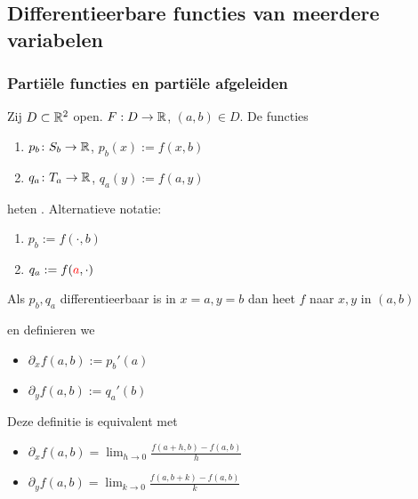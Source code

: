 \documentclass{2wa40summary}
\begin{document}
	\subsection{Differentieerbare functies van meerdere variabelen}
	\subsubsection{Parti\"ele functies en parti\"ele afgeleiden}
	
	\begin{define}
		Zij $D \subset \mathbb{R}^2$ open. $F:D \rightarrow \mathbb{R}$, $(a,b) \in D$.
		De functies
		\begin{enumerate}
			\item $p_b\colon S_b \rightarrow \mathbb{R}$, $p_b(x):=f(x,b)$
			\item $q_a\colon T_a \rightarrow \mathbb{R}$, $q_a(y):=f(a,y)$
		\end{enumerate}
		heten .
		Alternatieve notatie:
		\begin{enumerate}
			\item $p_b:=f(\cdot, b)$
			\item $q_a:=f({\color{red}a},\cdot)$
		\end{enumerate}
		
	\end{define}
	
	\begin{define}
		Als $p_b, q_a$ differentieerbaar is in $x=a,y=b$ dan heet $f$  naar $x,y$ in $(a,b)$
		
		en definieren we
		\begin{itemize}
			\item $\partial_x f(a,b) := p_b'(a)$
			\item $\partial_y f(a,b) := q_a'(b)$
		\end{itemize}
		
	\end{define}
	
	\begin{gevolg}
		
		Deze definitie is equivalent met
		\begin{itemize}
			\item $\displaystyle\partial_x f(a,b)=\lim_{h \rightarrow 0} \frac{f(a+h,b)-f(a,b)}{h}$
			\item $\displaystyle\partial_y f(a,b)=\lim_{k \rightarrow 0} \frac{f(a,b+k)-f(a,b)}{k}$
		\end{itemize}
		
	\end{gevolg}
	
\end{document}
